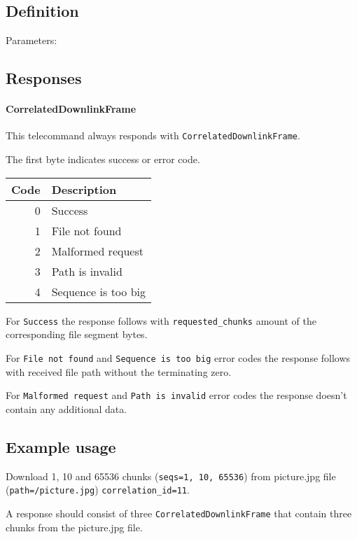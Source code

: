 \subsection{Definition}

Parameters: 

\begin{tcarglist}
\end{tcarglist}

\subsection{Responses}

\paragraph{CorrelatedDownlinkFrame}

This telecommand always responds with \texttt{CorrelatedDownlinkFrame}.

The first byte indicates success or error code.

\begin{tabular}{r | l}
	Code & Description \\ \hline
	0 		& Success \\
	1 		& File not found \\
	2 		& Malformed request \\
	3 		& Path is invalid \\
	4 		& Sequence is too big
\end{tabular}

For \texttt{Success} the response follows with \texttt{requested\_chunks} amount of the corresponding file segment bytes.

For \texttt{File not found} and \texttt{Sequence is too big} error codes the response follows with received file path without the terminating zero.

For \texttt{Malformed request} and \texttt{Path is invalid} error codes the response doesn't contain any additional data.

\subsection{Example usage}
Download 1, 10 and 65536 chunks (\texttt{seqs=1, 10, 65536}) from picture.jpg file (\texttt{path=/picture.jpg}) \texttt{correlation\_id=11}.


A response should consist of three \texttt{CorrelatedDownlinkFrame} that contain three chunks from the picture.jpg file.
